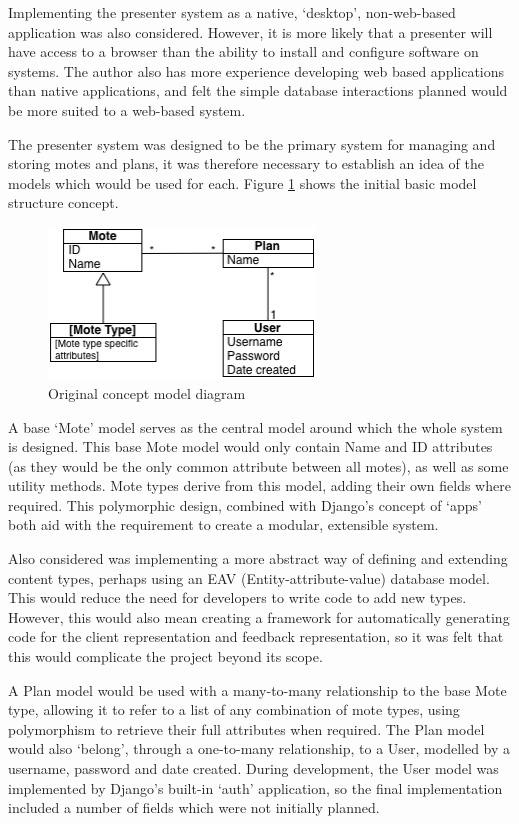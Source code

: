 \documentclass[a4papert,11pt,notitlepage]{ltxdoc}
\begin{document}
Implementing the presenter system as a native, `desktop', non-web-based application was also considered. However, it is more likely that a presenter will have access to a browser than the ability to install and configure software on systems. The author also has more experience developing web based applications than native applications, and felt the simple database interactions planned would be more suited to a web-based system.

The presenter system was designed to be the primary system for managing and storing motes and plans, it was therefore necessary to establish an idea of the models which would be used for each. Figure \ref{fig:classdiagram} shows the initial basic model structure concept.

\begin{figure}
\caption{Original concept model diagram}
\label{fig:classdiagram}
\centering
\includegraphics[width=200pt]{classdiagram}
\end{figure}

A base `Mote' model serves as the central model around which the whole system is designed. This base Mote model would only contain Name and ID attributes (as they would be the only common attribute between all motes), as well as some utility methods. Mote types derive from this model, adding their own fields where required. This polymorphic design, combined with Django's concept of `apps' both aid with the requirement to create a modular, extensible system.

Also considered was implementing a more abstract way of defining and extending content types, perhaps using an EAV (Entity-attribute-value) database model. This would reduce the need for developers to write code to add new types. However, this would also mean creating a framework for automatically generating code for the client representation and feedback representation, so it was felt that this would complicate the project beyond its scope.

A Plan model would be used with a many-to-many relationship to the base Mote type, allowing it to refer to a list of any combination of mote types, using polymorphism to retrieve their full attributes when required. The Plan model would also `belong', through a one-to-many relationship, to a User, modelled by a username, password and date created. During development, the User model was implemented by Django's built-in `auth' application, so the final implementation included a number of fields which were not initially planned.
\end{document}

